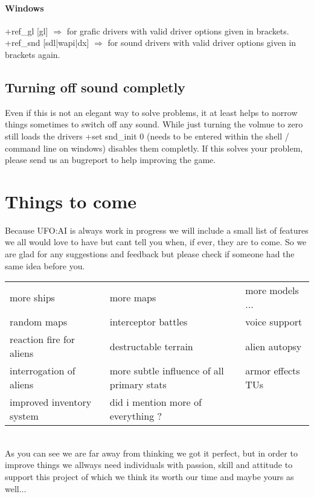 \paragraph*{Windows}
+ref_gl [gl] $\Longrightarrow$ for grafic drivers with valid driver options given in brackets.
+ref_snd [sdl|wapi|dx] $\Longrightarrow$ for sound drivers with valid driver options given in brackets 																						again.

\subsection{Turning off sound completly}
Even if this is not an elegant way to solve problems, it at least helps to norrow things sometimes to switch off any sound. While just turning the volmue to zero still loads the drivers +set snd_init 0 (needs to be entered within the shell / command line on windows) disables them completly. If this solves your problem, please send us an bugreport to help improving the game.


\section{Things to come}
Because UFO:AI is always work in progress we will include a small list of features we all would love to have but cant tell you when, if ever, they are to come. So we are glad for any suggestions and feedback but please check if someone had the same idea before you.
\\
\begin{tabular}{lll}
more ships  & more maps & more models ...   \\ 
random maps & interceptor battles & voice support \\ 
reaction fire for aliens  & destructable terrain & alien autopsy \\ 
interrogation of aliens  & more subtle influence of all primary stats & armor effects TUs \\ 
improved inventory system & did i mention more of everything ? &  \\ 
\end{tabular} 
\\
As you can see we are far away from thinking we got it perfect, but in order to improve things we allways need individuals with passion, skill and attitude to support this project of which we think its worth our time and maybe yours as well...
